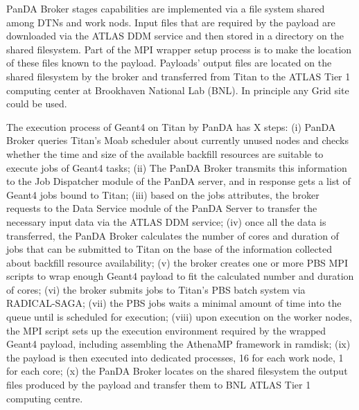 PanDA Broker stages capabilities are implemented via a file system shared among
DTNs and work nods. Input files that are required by the payload are downloaded
via the ATLAS DDM service and then stored in a directory on the shared
filesystem. Part of the MPI wrapper setup process is to make the location of
these files known to the payload. Payloads' output files are located on the
shared filesystem by the broker and transferred from Titan to the ATLAS Tier 1
computing center at Brookhaven National Lab (BNL). In principle any Grid site
could be used.

The execution process of Geant4 on Titan by PanDA has X steps: (i) PanDA Broker
queries Titan's Moab scheduler about currently unused nodes and checks whether
the time and size of the available backfill resources are suitable to execute
jobs of Geant4 tasks; (ii) The PanDA Broker transmits this information to the
Job Dispatcher module of the PanDA server, and in response gets a list of Geant4
jobs bound to Titan; (iii) based on the jobs attributes, the broker requests to
the Data Service module of the PanDA Server to transfer the necessary input data
via the ATLAS DDM service; (iv) once all the data is transferred, the PanDA
Broker calculates the number of cores and duration of jobs that can be submitted
to Titan on the base of the information collected about backfill resource
availability; (v) the broker creates one or more PBS MPI scripts to wrap enough
Geant4 payload to fit the calculated number and duration of cores; (vi) the
broker submits jobs to Titan's PBS batch system via RADICAL-SAGA; (vii) the PBS
jobs waits a minimal amount of time into the queue until is scheduled for
execution; (viii) upon execution on the worker nodes, the MPI script sets up the
execution environment required by the wrapped Geant4 payload, including
assembling the AthenaMP framework in ramdisk; (ix) the payload is then executed
into dedicated processes, 16 for each work node, 1 for each core; (x) the PanDA
Broker locates on the shared filesystem the output files produced by the payload
and transfer them to BNL ATLAS Tier 1 computing centre.



